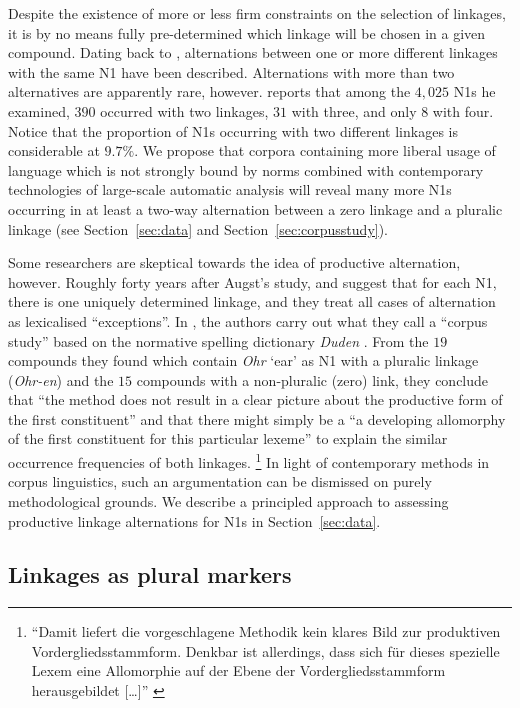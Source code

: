 Despite the existence of more or less firm constraints on the selection of linkages, it is by no means fully pre-determined which linkage will be chosen in a given compound.
Dating back to \textcite{Augst1975}, alternations between one or more different linkages with the same N1 have been described.
Alternations with more than two alternatives are apparently rare, however.
\textcite[134--135]{Augst1975} reports that among the $4,025$ N1s he examined, $390$ occurred with two linkages, $31$ with three, and only $8$ with four.
Notice that the proportion of N1s occurring with two different linkages is considerable at $9.7\%$.
We propose that corpora containing more liberal usage of language which is not strongly bound by norms combined with contemporary technologies of large-scale automatic analysis will reveal many more N1s occurring in at least a two-way alternation between a zero linkage and a pluralic linkage (see Section~\ref{sec:data} and Section~\ref{sec:corpusstudy}).

Some researchers are skeptical towards the idea of productive alternation, however.
Roughly forty years after Augst's study, \textcite[31]{NeefBorgwaldt2012} and \textcite[46]{Neef2015} suggest that for each N1, there is one uniquely determined linkage, and they treat all cases of alternation as lexicalised ``exceptions''.
In \textcite[42]{NeefBorgwaldt2012}, the authors carry out what they call a ``corpus study'' based on the normative spelling dictionary \textit{Duden} \parencite{Duden2006}.
From the $19$ compounds they found which contain \textit{Ohr} `ear' as N1 with a pluralic linkage (\textit{Ohr-en}) and the $15$ compounds with a non-pluralic (zero) link, they conclude that ``the method does not result in a clear picture about the productive form of the first constituent'' and that there might simply be a ``a developing allomorphy of the first constituent for this particular lexeme'' to explain the similar occurrence frequencies of both linkages.%
\footnote{``Damit liefert die vorgeschlagene Methodik kein klares Bild zur produktiven Vordergliedsstammform.
Denkbar ist allerdings, dass sich für dieses spezielle Lexem eine Allomorphie auf der Ebene der Vordergliedsstammform herausgebildet [\ldots]'' \parencite[31]{NeefBorgwaldt2012}}
In light of contemporary methods in corpus linguistics, such an argumentation can be dismissed on purely methodological grounds.
We describe a principled approach to assessing productive linkage alternations for N1s in Section~\ref{sec:data}.


\subsection{Linkages as plural markers}
\label{sec:linkagesaspluralmarkers}

